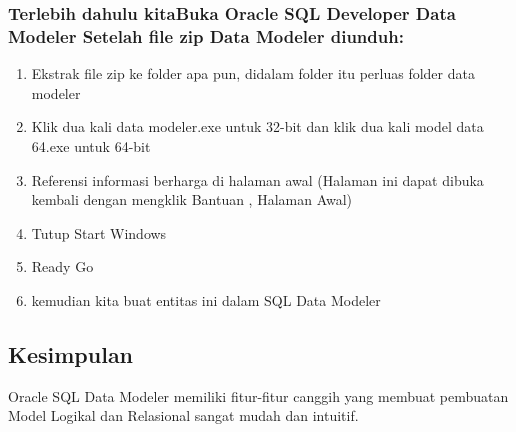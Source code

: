 \documentclass{article}
\begin{document}
\begin{enumerate}
\subsubsection{Terlebih dahulu kitaBuka Oracle SQL Developer Data Modeler
Setelah file zip Data Modeler diunduh:}
\begin{enumerate}
    \item Ekstrak file zip ke folder apa pun, didalam folder itu perluas folder data modeler
    \item Klik dua kali data modeler.exe untuk 32-bit dan klik dua kali model data 64.exe untuk 64-bit
    \item Referensi informasi berharga di halaman awal (Halaman ini dapat dibuka kembali dengan mengklik Bantuan , Halaman Awal)
    \item Tutup Start Windows
    \item Ready Go
    \item kemudian kita buat entitas ini dalam SQL Data Modeler
\end{enumerate}
\subsection{Kesimpulan}
Oracle SQL Data Modeler memiliki fitur-fitur canggih yang membuat  pembuatan Model Logikal dan Relasional sangat mudah dan intuitif.


\end{enumerate}
\end{document}
